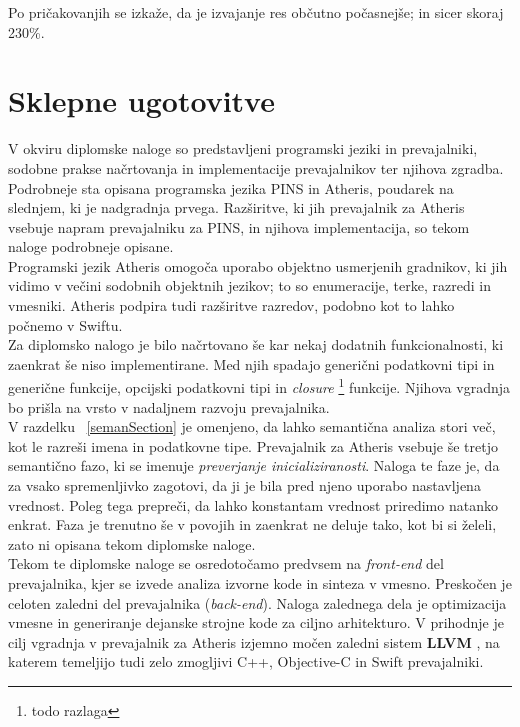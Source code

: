 \documentclass[a4paper, 12p]{book}
\begin{document}

Po pričakovanjih se izkaže, da je izvajanje res občutno počasnejše; in sicer skoraj 230\%. 

\chapter{Sklepne ugotovitve}

V okviru diplomske naloge so predstavljeni programski jeziki in prevajalniki, sodobne prakse načrtovanja in implementacije prevajalnikov ter njihova zgradba. Podrobneje sta opisana programska jezika PINS in Atheris, poudarek na slednjem, ki je nadgradnja prvega. Razširitve, ki jih prevajalnik za Atheris vsebuje napram prevajalniku za PINS, in njihova implementacija, so tekom naloge podrobneje opisane. \\
\indent Programski jezik Atheris omogoča uporabo objektno usmerjenih gradnikov, ki jih vidimo v večini sodobnih objektnih jezikov; to so enumeracije, terke, razredi in vmesniki. Atheris podpira tudi razširitve razredov, podobno kot to lahko počnemo v Swiftu. \\
\indent Za diplomsko nalogo je bilo načrtovano še kar nekaj dodatnih funkcionalnosti, ki zaenkrat še niso implementirane. Med njih spadajo generični podatkovni tipi in generične funkcije, opcijski podatkovni tipi in \textit{closure} \footnote{todo razlaga} funkcije. Njihova vgradnja bo prišla na vrsto v nadaljnem razvoju prevajalnika. \\
\indent  V razdelku ~\ref{semanSection} je omenjeno, da lahko semantična analiza stori več, kot le razreši imena in podatkovne tipe. Prevajalnik za Atheris vsebuje še tretjo semantično fazo, ki se imenuje \textit{preverjanje inicializiranosti}. Naloga te faze je, da za vsako spremenljivko zagotovi, da ji je bila pred njeno uporabo nastavljena vrednost. Poleg tega prepreči, da lahko konstantam vrednost priredimo natanko enkrat. Faza je trenutno še v povojih in zaenkrat ne deluje tako, kot bi si želeli, zato ni opisana tekom diplomske naloge. \\
\indent Tekom te diplomske naloge se osredotočamo predvsem na \textit{front-end} del prevajalnika, kjer se izvede analiza izvorne kode in sinteza v vmesno. Preskočen je celoten zaledni del prevajalnika (\textit{back-end}). Naloga zalednega dela je optimizacija vmesne in generiranje dejanske strojne kode za ciljno arhitekturo. V prihodnje je cilj vgradnja v prevajalnik za Atheris izjemno močen zaledni sistem \textbf{LLVM} \cite{LLVM}, na katerem temeljijo tudi zelo zmogljivi C++, Objective-C in Swift prevajalniki.
\end{document}
